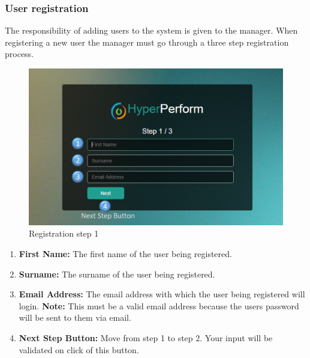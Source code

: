\documentclass[11pt,a4paper]{article}
\begin{document}
\subsubsection{User registration}
The responsibility of adding users to the system is given to the manager. When registering a new user the manager must go through a three step registration process.

\begin{figure}[H]
	\begin{center}
		\includegraphics[scale=0.35]{../Images/Getting_Started/Step_1_numbered}
		\caption{Registration step 1}
	\end{center}
\end{figure}
\begin{enumerate}
	\item \textbf{First Name:} The first name of the user being registered.
	\item \textbf{Surname:} The surname of the user being registered.
	\item \textbf{Email Address:} The email address with which the user being registered will login. \textbf{Note:} This must be a valid email address because the users password will be sent to them via email. 
	\item \textbf{Next Step Button:} Move from step 1 to step 2. Your input will be validated on click of this button. 
\end{enumerate}
\end{document}
